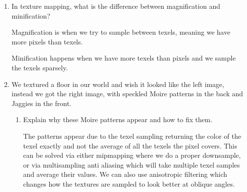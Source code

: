 \documentclass{article}
\begin{document}
\begin{enumerate}
            \begin{mdframed}
                You would use spherical parameterization to map
                textures onto spheres, or when doing specific kinds of
                map projections.

                Essentially you take each vertex on the sphere in terms of
                the azimuth and elevation, or just two angles, and the radius.
                For texture mapping you just drop the radius and use the
                two angles as your uv coordinates.

                There are other ways to parameterize a sphere, including
                using another shape like a cube and then projecting
                each point on the cube onto the sphere.
            \end{mdframed}

        \item In texture mapping, what is the difference between magnification and minification?
            \begin{mdframed}
                Magnification is when we try to sample between texels, meaning we have more pixels
                than texels.

                Minification happens when we have more texels than pixels and we sample
                the texels sparsely.
            \end{mdframed}

        \item We textured a floor in our world and wish it looked like the left image, instead we
            got the right image, with speckled Moire patterns in the back and Jaggies in the
            front.

            \begin{enumerate}
                \item Explain why these Moire patterns appear and how to fix them.
                    \begin{mdframed}
                        The patterns appear due to the texel sampling returning the color
                        of the texel exactly and not the average of all the texels the pixel covers.
                        This can be solved via either mipmapping where we do a proper downsample,
                        or via multisampling anti aliasing which will take multiple texel samples and
                        average their values. We can also use anisotropic filtering which changes how
                        the textures are sampled to look better at oblique angles.
                    \end{mdframed}


\end{enumerate}
\end{enumerate}
\end{document}
